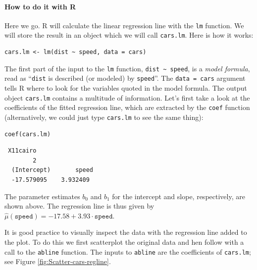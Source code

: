 \documentclass[captions=tableheading]{scrbook}
\begin{document}
\paragraph*{How to do it with \textsf{R}}



Here we go. \textsf{R} will calculate the linear regression line with the \texttt{lm} function. We will store the result in an object which we will call \texttt{cars.lm}. Here is how it works:


\begin{verbatim}
cars.lm <- lm(dist ~ speed, data = cars)
\end{verbatim}

The first part of the input to the \texttt{lm} function, \texttt{dist \textasciitilde{} speed}, is a \emph{model formula}, read as ``\texttt{dist} is described (or modeled) by \texttt{speed}''. The \texttt{data = cars} argument tells \textsf{R} where to look for the variables quoted in the model formula. The output object \texttt{cars.lm} contains a multitude of information. Let's first take a look at the coefficients of the fitted regression line, which are extracted by the \texttt{coef} function (alternatively, we could just type \texttt{cars.lm} to see the same thing):


\begin{verbatim}
coef(cars.lm)
\end{verbatim}

\begin{verbatim}
 X11cairo 
        2
  (Intercept)       speed 
  -17.579095    3.932409
\end{verbatim}

The parameter estimates \( b_{0} \) and \( b_{1} \) for the intercept and slope, respectively, are shown above. The regression line is thus given by \( \hat{\mu}(\mathtt{speed}) =  -17.58 +  3.93 \cdot \mathtt{speed} \).

It is good practice to visually inspect the data with the regression line added to the plot. To do this we first scatterplot the original data and hen follow with a call to the \texttt{abline} function. The inputs to \texttt{abline} are the coefficients of \texttt{cars.lm}; see Figure \ref{fig:Scatter-cars-regline}.
\end{document}
